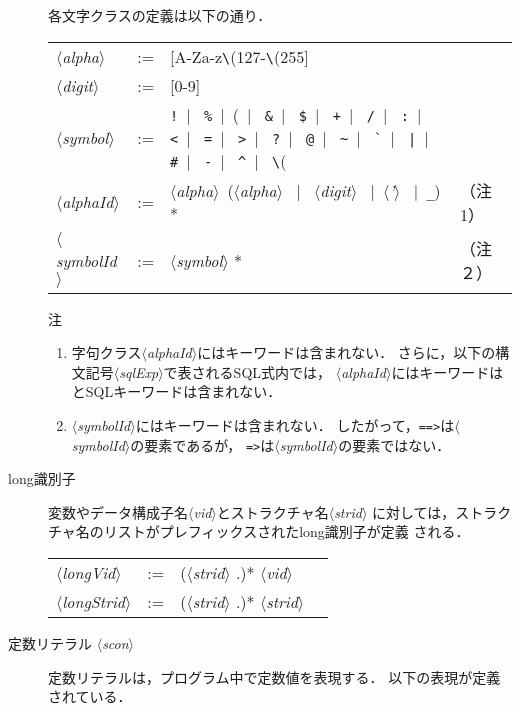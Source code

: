 \documentclass{jbook}
\newcommand{\vbar}{\mbox{\ $|$\ }}
\newcommand{\nonterm}[1]{\mbox{$\langle$}{\it #1}\mbox{$\rangle$}}
\newcommand{\term}[1]{\mbox{{\tt #1}}}
\begin{document}
\begin{description}
	各文字クラスの定義は以下の通り．

\begin{center}
\begin{tabular}{lcll}
\nonterm{alpha} &:=& [A-Za-z\verb(\(127-\verb(\(255]\\
\nonterm{digit} &:=& [0-9]\\
\nonterm{symbol} &:=& 
\verb(!(\vbar{}
\verb(%(\vbar{}
\verb(&(\vbar{}
\verb($(\vbar{}
\verb(+(\vbar{}
\verb(/(\vbar{}
\verb(:(\vbar{}
\verb(<(\vbar{}
\verb(=(\vbar{}
\verb(>(\vbar{}
\verb(?(\vbar{}
\verb(@(\vbar{}
\verb(~(\vbar{}
\verb(`(\vbar{}
\verb(|(\vbar{}
\verb(#(\vbar{}
\verb(-(\vbar{}
\verb(^(\vbar{}
\verb(\(\
\\
\nonterm{alphaId} &:=& \nonterm{alpha}\ (\nonterm{alpha} \vbar
	\nonterm{digit} \vbar \nonterm{'} \vbar \term{\_}) * & （注1）
\\
\nonterm{symbolId} &:=& \nonterm{symbol} * & （注２）
\end{tabular}
\end{center}%

注
\begin{enumerate}
\item 字句クラス\nonterm{alphaId}にはキーワードは含まれない．
	さらに，以下の構文記号\nonterm{sqlExp}で表されるSQL式内では，
\nonterm{alphaId}にはキーワードはとSQLキーワードは含まれない．
\item \nonterm{symbolId}にはキーワードは含まれない．
	したがって，\term{==>}は\nonterm{symbolId}の要素であるが，
\term{=>}は\nonterm{symbolId}の要素ではない．
\end{enumerate}

	
\item[long識別子]
\label{sec:lexicalItems:longid}
	変数やデータ構成子名\nonterm{vid}とストラクチャ名\nonterm{strid}
に対しては，ストラクチャ名のリストがプレフィックスされたlong識別子が定義
される．

\begin{center}
\begin{tabular}{lcll}
\nonterm{longVid} &:=& (\nonterm{strid} .)* \nonterm{vid}\\
\nonterm{longStrid} &:=& (\nonterm{strid} .)* \nonterm{strid}
\end{tabular}
\end{center}


\item[定数リテラル \nonterm{scon}] 
\label{sec:lexicalItems:constants}
	定数リテラルは，プログラム中で定数値を表現する．
	以下の表現が定義されている．


\end{description}
\end{document}
